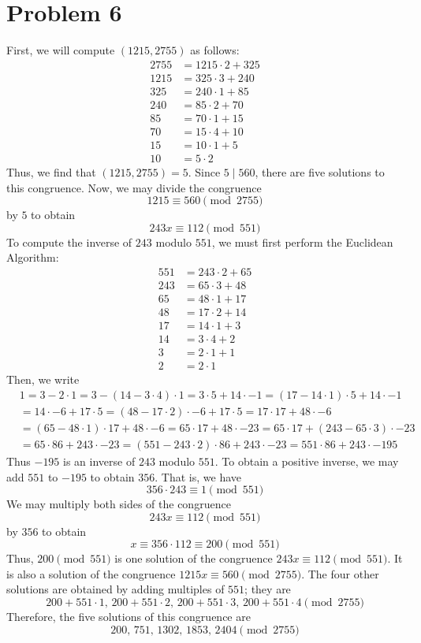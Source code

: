\documentclass[12pt]{article}
\begin{document}
\section*{Problem 6}
First, we will compute $(1215,2755)$ as follows:
\begin{align*}
2755 &= 1215 \cdot 2 + 325\\
1215 &= 325 \cdot 3 + 240\\
325 &= 240 \cdot 1+ 85\\
240 &= 85 \cdot 2 + 70\\
85 &= 70 \cdot 1+ 15\\
70 &= 15 \cdot 4 + 10\\
15 &= 10 \cdot 1 + 5\\
10 &= 5 \cdot 2
\end{align*} Thus, we find that $(1215, 2755) = 5$. Since $5 \mid 560$, there are five solutions to this congruence. Now, we may divide the congruence
\[
1215 \equiv 560 \pmod{2755}
\] by $5$ to obtain
\[
243 x \equiv 112 \pmod{551}
\] To compute the inverse of $243$ modulo $551$, we must first perform the Euclidean Algorithm:
\begin{align*}
551 &= 243 \cdot 2 + 65 \\
243 & = 65 \cdot 3 + 48\\
65 & = 48 \cdot 1 + 17 \\
48 & = 17 \cdot 2+ 14 \\
17 & = 14 \cdot 1 + 3 \\
14 & = 3\cdot 4 + 2\\
3 & = 2 \cdot 1 + 1 \\
2 & = 2 \cdot 1
\end{align*} Then, we write
\begin{align*}
&1 = 3 - 2\cdot 1 = 3 - (14 - 3\cdot 4) \cdot 1 = 3 \cdot 5 + 14 \cdot - 1 = (17 - 14 \cdot 1) \cdot 5 + 14 \cdot -1 \\
& = 14 \cdot - 6 + 17 \cdot 5 = (48 - 17 \cdot 2) \cdot -6 + 17 \cdot 5 = 17 \cdot 17 + 48 \cdot -6\\
& = (65 - 48 \cdot 1) \cdot 17 + 48 \cdot -6 = 65 \cdot 17 + 48 \cdot -23 = 65\cdot 17 + (243 - 65 \cdot 3) \cdot -23 \\
& = 65 \cdot 86 + 243 \cdot -23 = (551 - 243 \cdot 2) \cdot 86 + 243 \cdot -23 = 551 \cdot 86 + 243 \cdot -195
\end{align*} Thus $-195$ is an inverse of $243$ modulo $551$. To obtain a positive inverse, we may add $551$ to $-195$ to obtain $356$. That is, we have
\[
356 \cdot 243 \equiv 1 \pmod{551}
\] We may multiply both sides of the congruence
\[
243x \equiv 112 \pmod{551}
\] by $356$ to obtain
\[
x \equiv 356 \cdot 112 \equiv 200 \pmod{551}
\] Thus, $200 \pmod{551}$ is one solution of the congruence $243 x \equiv 112 \pmod{551}$. It is also a solution of the congruence $1215 x \equiv 560 \pmod{2755}$. The four other solutions are obtained by adding multiples of $551$; they are
\[
200 + 551 \cdot 1,\, 200 + 551 \cdot 2,\, 200 + 551 \cdot 3,\, 200 + 551 \cdot 4 \pmod{2755}
\] Therefore, the five solutions of this congruence are
\[
200, \, 751,\, 1302,\, 1853,\, 2404 \pmod{2755}
\]
\end{document}
